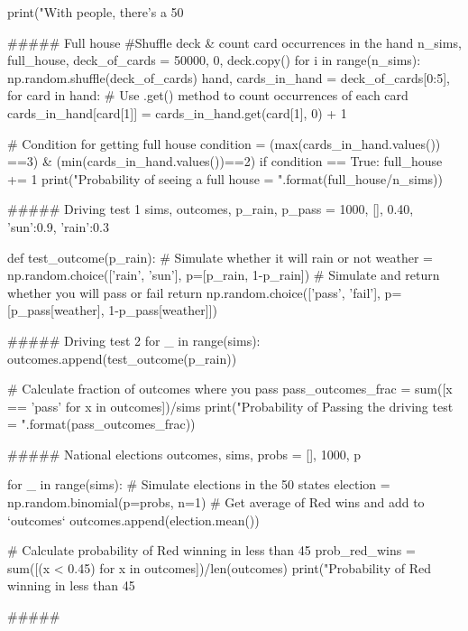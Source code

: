 print("With {} people, there's a 50%

##### Full house
#Shuffle deck & count card occurrences in the hand
n_sims, full_house, deck_of_cards = 50000, 0, deck.copy() 
for i in range(n_sims):
    np.random.shuffle(deck_of_cards)
    hand, cards_in_hand = deck_of_cards[0:5], {}
    for card in hand:
        # Use .get() method to count occurrences of each card
        cards_in_hand[card[1]] = cards_in_hand.get(card[1], 0) + 1
        
    # Condition for getting full house
    condition = (max(cards_in_hand.values()) ==3) & (min(cards_in_hand.values())==2)
    if  condition == True: 
        full_house += 1
print("Probability of seeing a full house = {}".format(full_house/n_sims))

##### Driving test 1
sims, outcomes, p_rain, p_pass = 1000, [], 0.40, {'sun':0.9, 'rain':0.3}

def test_outcome(p_rain):
    # Simulate whether it will rain or not
    weather = np.random.choice(['rain', 'sun'], p=[p_rain, 1-p_rain])
    # Simulate and return whether you will pass or fail
    return np.random.choice(['pass', 'fail'], p=[p_pass[weather], 1-p_pass[weather]])

##### Driving test 2
for _ in range(sims):
    outcomes.append(test_outcome(p_rain))

# Calculate fraction of outcomes where you pass
pass_outcomes_frac = sum([x == 'pass' for x in outcomes])/sims
print("Probability of Passing the driving test = {}".format(pass_outcomes_frac))

##### National elections
outcomes, sims, probs = [], 1000, p

for _ in range(sims):
    # Simulate elections in the 50 states
    election = np.random.binomial(p=probs, n=1)
    # Get average of Red wins and add to `outcomes`
    outcomes.append(election.mean())

# Calculate probability of Red winning in less than 45%
prob_red_wins = sum([(x < 0.45) for x in outcomes])/len(outcomes)
print("Probability of Red winning in less than 45%

##### 
